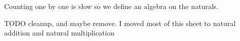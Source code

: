 
\sbasic








\sstart
{}


Counting one by one is slow so we define
an algebra on the naturals.

TODO cleanup, and maybe remove. I moved most of this
sheet to natural addition and natural multiplication



\strats
